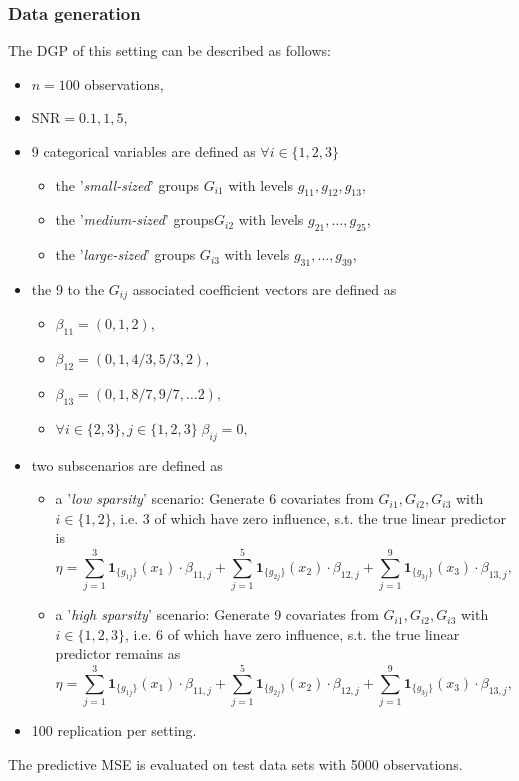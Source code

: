 \documentclass[12pt,letterpaper]{article}
\numberwithin{equation}{subsection}
\begin{document}
\subsubsection{Data generation}
\label{sec:lpdgp}
The DGP of this setting can be described as follows:
\begin{itemize}
\item $n = 100$ observations,
\item $\text{SNR} = 0.1, 1, 5$,
\item 9 categorical variables are defined as $\forall i \in \{1,2,3\}$
\begin{itemize}
\item the '\textit{small-sized}' groups $G_{i1}$ with levels $g_{11},g_{12},g_{13}$,
\item the '\textit{medium-sized}' groups$G_{i2}$ with levels $g_{21},\dots,g_{25}$,
\item the '\textit{large-sized}' groups $G_{i3}$ with levels $g_{31},\dots,g_{39}$,
\end{itemize}
\item the 9 to the $G_{ij}$ associated coefficient vectors are defined as
\begin{itemize}
\item $\beta_{11} = (0,1,2),$ 
\item $\beta_{12} = (0,1,4/3,5/3,2),$ 
\item $\beta_{13} = (0,1,8/7,9/7,\dots2),$ 
\item $\forall i \in \{2,3\}, j \in \{1,2,3\} \;\beta_{ij} = 0,$ 
\end{itemize}
\item two subscenarios are defined as
\begin{itemize}
\item a '\textit{low sparsity}' scenario: Generate 6 covariates from $G_{i1},G_{i2},G_{i3}$ with $i \in \{1,2\}$, i.e. 3 of which have zero influence, s.t. the true linear predictor is 
\begin{equation*}
\eta = \sum^3_{j=1}\mathbf{1}_{\{g_{1j}\}}(x_1) \cdot \beta_{11,j} +  \sum^5_{j=1}\mathbf{1}_{\{g_{2j}\}}(x_2) \cdot \beta_{12,j} +  
\sum^9_{j=1}\mathbf{1}_{\{g_{3j}\}}(x_3) \cdot \beta_{13,j},
\end{equation*}
\item a '\textit{high sparsity}' scenario: Generate 9 covariates from $G_{i1},G_{i2},G_{i3}$ with $i \in \{1,2,3\}$, i.e. 6 of which have zero influence, s.t. the true linear predictor remains as
\begin{equation*}
\eta = \sum^3_{j=1}\mathbf{1}_{\{g_{1j}\}}(x_1) \cdot \beta_{11,j} +  \sum^5_{j=1}\mathbf{1}_{\{g_{2j}\}}(x_2) \cdot \beta_{12,j} +  
\sum^9_{j=1}\mathbf{1}_{\{g_{3j}\}}(x_3) \cdot \beta_{13,j},
\end{equation*}
\end{itemize}
\item 100 replication per setting.
\end{itemize}
The predictive MSE is evaluated on test data sets with 5000 observations.
\end{document}
